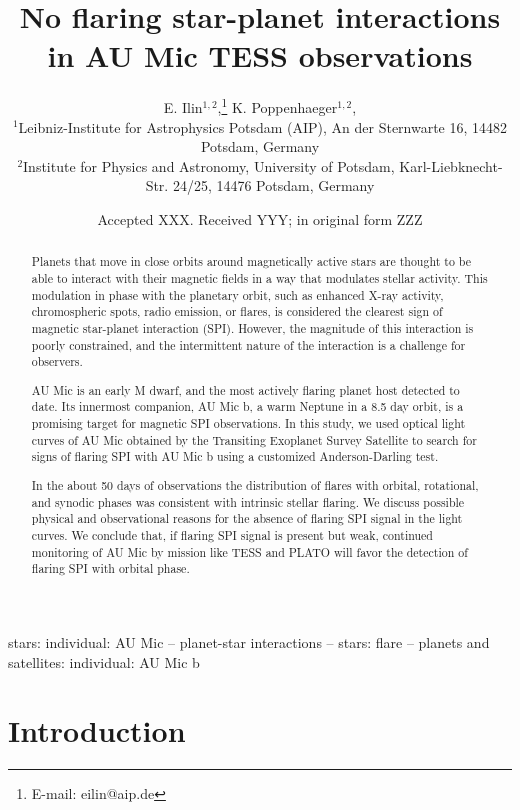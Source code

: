 \documentclass[fleqn,usenatbib,letters]{mnras}%
\title[]{No flaring star-planet interactions in AU Mic TESS observations}
\author[E. Ilin et al.]{
E. Ilin$^{1,2}$,\thanks{E-mail: eilin@aip.de}
K. Poppenhaeger$^{1,2}$,
\\
$^{1}$Leibniz-Institute for Astrophysics Potsdam (AIP), An der Sternwarte 16, 14482 Potsdam, Germany\\
$^{2}$Institute for Physics and Astronomy, University of Potsdam, Karl-Liebknecht-Str. 24/25, 14476 Potsdam, Germany
}
\date{Accepted XXX. Received YYY; in original form ZZZ}
\begin{document}
\label{firstpage}
\pagerange{\pageref{firstpage}--\pageref{lastpage}}
\maketitle

\begin{abstract}
Planets that move in close orbits around magnetically active stars are thought to be able to interact with their magnetic fields in a way that modulates stellar activity. This modulation in phase with the planetary orbit, such as enhanced X-ray activity, chromospheric spots, radio emission, or flares, is considered the clearest sign of magnetic star-planet interaction (SPI). However, the magnitude of this interaction is poorly constrained, and the intermittent nature of the interaction is a challenge for observers. 

AU Mic is an early M dwarf, and the most actively flaring planet host detected to date. Its innermost companion, AU Mic b, a warm Neptune in a 8.5 day orbit, is a promising target for magnetic SPI observations. In this study, we used optical light curves of AU Mic obtained by the Transiting Exoplanet Survey Satellite to search for signs of flaring SPI with AU Mic b using a customized Anderson-Darling test. 

In the about 50 days of observations the distribution of flares with orbital, rotational, and synodic phases was consistent with intrinsic stellar flaring. We discuss possible physical and observational reasons for the absence of flaring SPI signal in the light curves. We conclude that, if flaring SPI signal is present but weak, continued monitoring of AU Mic by mission like TESS and PLATO will favor the detection of flaring SPI with orbital phase.

\end{abstract}

\begin{keywords}
stars: individual: AU Mic -- planet-star interactions -- stars: flare -- planets and satellites: individual: AU Mic b
\end{keywords}

%

\section{Introduction}
\end{document}
